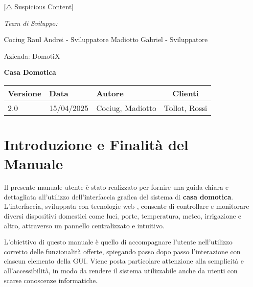 [⚠️ Suspicious Content] \documentclass[a4paper,12pt]{article}
\begin{document}
\begin{titlepage}
    \begin{minipage}[t]{0.4\textwidth}
    \raggedright
    {\large\itshape Team di Sviluppo:\par}
    \vspace{0.2cm}
    
    Cociug Raul Andrei - Sviluppatore 
    Madiotto Gabriel - Sviluppatore
    \end{minipage}
    \hfill
    \begin{minipage}[t]{0.4\textwidth}
    \raggedleft
    {\Large Azienda: DomotiX\par}
    \end{minipage}
    
    \centering
    \vspace*{5cm}
    
    {\Huge\bfseries Casa Domotica\par}
    \vspace{1.5cm}
    
    \vfill
    
    \begin{table}[h]
    \centering
    \begin{tabular}{@{}lllc@{}}
    \toprule
    Versione & Data & Autore & Clienti \\  
    \midrule
    2.0 & 15/04/2025 & Cociug, Madiotto & Tollot, Rossi \\
    \bottomrule
    \end{tabular}
    \end{table}
    
    \thispagestyle{empty}
\end{titlepage}
\tableofcontents
\newpage

\section{Introduzione e Finalità del Manuale}

Il presente manuale utente è stato realizzato per fornire una guida chiara e dettagliata all'utilizzo dell’interfaccia grafica del sistema di \textbf{casa domotica}. L’interfaccia, sviluppata con tecnologie web , consente di controllare e monitorare diversi dispositivi domestici come luci, porte, temperatura, meteo, irrigazione e altro, attraverso un pannello centralizzato e intuitivo.

L’obiettivo di questo manuale è quello di accompagnare l’utente nell’utilizzo corretto delle funzionalità offerte, spiegando passo dopo passo l’interazione con ciascun elemento della GUI. Viene posta particolare attenzione alla semplicità e all’accessibilità, in modo da rendere il sistema utilizzabile anche da utenti con scarse conoscenze informatiche.
\end{document}

